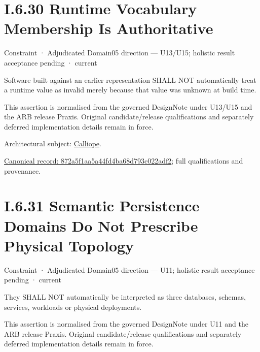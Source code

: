 \section*{I.6.30 Runtime Vocabulary Membership Is Authoritative}
\label{navigation:I.6.30}

\label{element:872a5f1aa5a44fd4ba68d793c022adf2}
{\small Constraint · Adjudicated Domain05 direction — U13/U15; holistic result acceptance pending · current}\par

Software built against an earlier representation SHALL NOT automatically
treat a runtime value as invalid merely because that value was unknown
at build time.



This assertion is normalised from the governed DesignNote under U13/U15 and the ARB release Praxis. Original candidate/release qualifications and separately deferred implementation details remain in force.



Architectural subject: \hyperref[element:466ad8f75a954c0581b5bba090443849]{Calliope}.


{\footnotesize \href{../../../../../../../continuum/motivation/constraint/872a5f1aa5a44fd4ba68d793c022adf2.md}{Canonical record: 872a5f1aa5a44fd4ba68d793c022adf2}; full qualifications and provenance.}\par
\section*{I.6.31 Semantic Persistence Domains Do Not Prescribe Physical Topology}
\label{navigation:I.6.31}

\label{element:eca9a99c2ad44a1ea7833d2b0c5a3e93}
{\small Constraint · Adjudicated Domain05 direction — U11; holistic result acceptance pending · current}\par

They SHALL NOT automatically be interpreted as three databases, schemas, services, workloads or physical deployments.



This assertion is normalised from the governed DesignNote under U11 and the ARB release Praxis. Original candidate/release qualifications and separately deferred implementation details remain in force.




